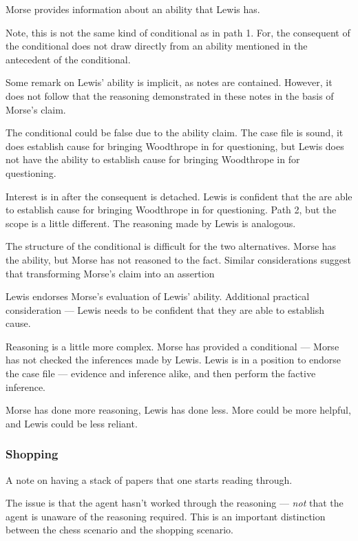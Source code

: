 \documentclass[10pt]{article}
\begin{document}
Morse provides information about an ability that Lewis has.


Note, this is not the same kind of conditional as in path 1.
For, the consequent of the conditional does not draw directly from an ability mentioned in the antecedent of the conditional.

Some remark on Lewis' ability is implicit, as notes are contained.
However, it does not follow that the reasoning demonstrated in these notes in the basis of Morse's claim.

The conditional could be false due to the ability claim.
The case file is sound, it does establish cause for bringing Woodthrope in for questioning, but Lewis does not have the ability to establish cause for bringing Woodthrope in for questioning.

Interest is in after the consequent is detached.
Lewis is confident that the are able to establish cause for bringing Woodthrope in for questioning.
Path 2, but the scope is a little different.
The reasoning made by Lewis is analogous.

The structure of the conditional is difficult for the two alternatives.
Morse has the ability, but Morse has not reasoned to the fact.
Similar considerations suggest that transforming Morse's claim into an assertion

Lewis endorses Morse's evaluation of Lewis' ability.
Additional practical consideration --- Lewis needs to be confident that they are able to establish cause.



Reasoning is a little more complex.
Morse has provided a conditional --- Morse has not checked the inferences made by Lewis.
Lewis is in a position to endorse the case file --- evidence and inference alike, and then perform the factive inference.


Morse has done more reasoning, Lewis has done less.
More could be more helpful, and Lewis could be less reliant.



\subsubsection{Shopping}
\label{sec:shopping}

\begin{note}
  A note on having a stack of papers that one starts reading through.
\end{note}

\begin{note}
   The issue is that the agent hasn't worked through the reasoning --- \emph{not} that the agent is unaware of the reasoning required.
  This is an important distinction between the chess scenario and the shopping scenario.
\end{note}
\end{document}
